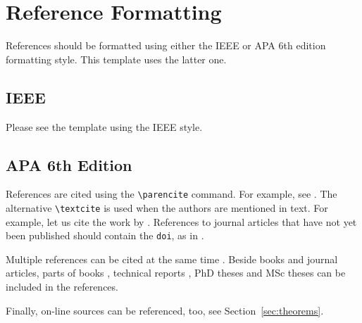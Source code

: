 % 
\chapter{Reference Formatting}

References should be formatted using either the IEEE or APA 6th edition formatting style. This template uses the latter one. 

\section{IEEE}

Please see the template using the IEEE style. 

\section{APA 6th Edition}

References are cited using the \texttt{\textbackslash parencite} command. For example, see \parencite{mihailovic06}. The alternative \texttt{\textbackslash textcite} is used when the authors are mentioned in text. For example, let us cite the work by \textcite{depolli13}. References to journal articles that have not yet been published should contain the \texttt{doi}, as in \parencite{tusar14}.

Multiple references can be cited at the same time \parencite{kobal04,grace10,novak12eng,zupanc13}. Beside books and journal articles, parts of books \parencite{smodis09}, technical reports \parencite{ivekovic13eng}, PhD theses \parencite{dovgan14eng} and MSc theses \parencite{tusar07eng} can be included in the references.

Finally, on-line sources can be referenced, too, see Section~\ref{sec:theorems}.